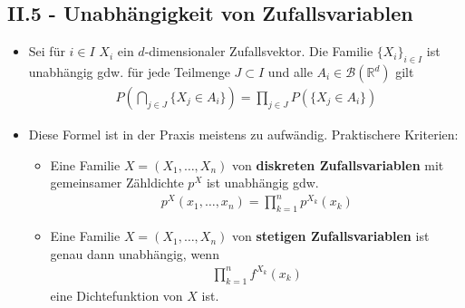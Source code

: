 \documentclass{scrartcl}
\newcommand{\borel}{\mc{B}(\mathbb{R}^d)}
\newcommand{\mc}[1]{\mathcal{#1}}
\begin{document}
\subsection*{II.5 - Unabhängigkeit von Zufallsvariablen}
\begin{itemize}
    \item Sei für $i \in I$ $X_i$ ein $d$-dimensionaler Zufallsvektor. Die Familie $\{X_i\}_{i \in I}$ ist unabhängig gdw. für jede Teilmenge $J \subset I$ und alle $A_i \in \borel$ gilt
    \begin{align*}
        P\left(\bigcap_{j \in J}\{X_j \in A_i\}\right) = \prod_{j \in J}P\left(\{X_j \in A_i\}\right)
    \end{align*}
    \item Diese Formel ist in der Praxis meistens zu aufwändig. Praktischere Kriterien:
    \begin{itemize}
        \item Eine Familie $X = (X_1, \hdots, X_n)$ von \textbf{diskreten Zufallsvariablen} mit gemeinsamer Zähldichte $p^X$ ist unabhängig gdw. 
        \begin{align*}
            p^X(x_1, \hdots, x_n) = \prod_{k = 1}^n p^{X_k}(x_k)
        \end{align*}
        \item Eine Familie $X = (X_1, \hdots, X_n)$ von \textbf{stetigen Zufallsvariablen} ist genau dann unabhängig, wenn
        \begin{align*}
            \prod_{k = 1}^n f^{X_k}(x_k)
        \end{align*}
        eine Dichtefunktion von $X$ ist.
    \end{itemize}
\end{itemize}
\end{document}

